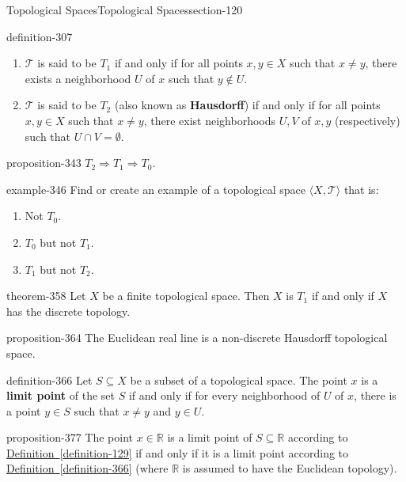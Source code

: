 \documentclass[oneside,10pt,]{article}
\newcommand{\terminology}[1]{\textbf{#1}}
\newcommand{\tuple}[1]{\langle #1 \rangle}
\newcommand{\mb}{\mathbb}
\newcommand{\mc}{\mathcal}
\begin{document}
\begin{sectionptx}{Topological Spaces}{}{Topological Spaces}{}{}{section-120}
\begin{definition}{}{definition-307}
\begin{enumerate}
\item\hypertarget{li-324}{}\(\mc T\) is said to be \terminology{\(T_1\)} if and only if for all points \(x,y\in X\) such that \(x\not=y\), there exists a neighborhood \(U\) of \(x\) such that \(y\not\in U\).%
\item\hypertarget{li-333}{}\(\mc T\) is said to be \terminology{\(T_2\)} (also known as \terminology{Hausdorff}) if and only if for all points \(x,y\in X\) such that \(x\not=y\), there exist neighborhoods \(U,V\) of \(x,y\) (respectively) such that \(U\cap V=\emptyset\).%
\end{enumerate}
\end{definition}
\begin{proposition}{}{}{proposition-343}%
\hypertarget{p-344}{}%
\(T_2\Rightarrow T_1\Rightarrow T_0\).%
\end{proposition}
\begin{example}{}{example-346}%
\hypertarget{p-347}{}%
Find or create an example of a topological space \(\tuple{X,\mc T}\) that is:%
\leavevmode%
\begin{enumerate}
\item\hypertarget{li-350}{}Not \(T_0\).%
\item\hypertarget{li-352}{}\(T_0\) but not \(T_1\).%
\item\hypertarget{li-355}{}\(T_1\) but not \(T_2\).%
\end{enumerate}
\end{example}
\begin{theorem}{}{}{theorem-358}%
\hypertarget{p-359}{}%
Let \(X\) be a finite topological space. Then \(X\) is \(T_1\) if and only if \(X\) has the discrete topology.%
\end{theorem}
\begin{proposition}{}{}{proposition-364}%
\hypertarget{p-365}{}%
The Euclidean real line is a non-discrete Hausdorff topological space.%
\end{proposition}
\begin{definition}{}{definition-366}%
\hypertarget{p-367}{}%
Let \(S\subseteq X\) be a subset of a topological space. The point \(x\) is a \terminology{limit point} of the set \(S\) if and only if for every neighborhood of \(U\) of \(x\), there is a point \(y\in S\) such that \(x\not=y\) and \(y\in U\).%
\end{definition}
\begin{proposition}{}{}{proposition-377}%
\hypertarget{p-378}{}%
The point \(x\in\mb R\) is a limit point of \(S\subseteq \mb R\) according to \hyperref[definition-129]{Definition~\ref{definition-129}} if and only if it is a limit point according to \hyperref[definition-366]{Definition~\ref{definition-366}} (where \(\mb R\) is assumed to have the Euclidean topology).%

\end{proposition}
\end{sectionptx}
\end{document}
